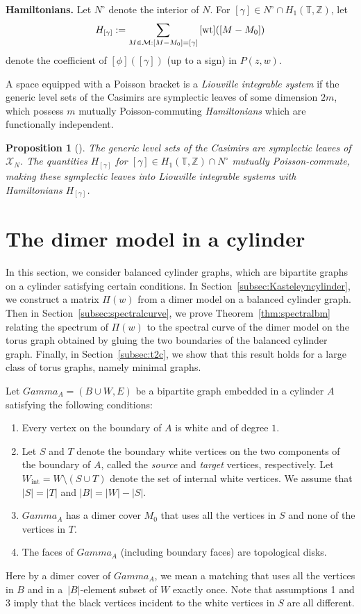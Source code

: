 \documentclass[10pt,a4paper]{amsart}
\numberwithin{equation}{section}
\newtheorem{Proposition}[Theorem]{Proposition}
 { \theoremstyle{definition}
\newtheorem{Definition}[Theorem]{Definition}
\newtheorem{Note}[Theorem]{Note}
\newtheorem{Example}[Theorem]{Example}
\newtheorem{Remark}[Theorem]{Remark} }
\newcommand{\Z}{{\mathbb Z}}
\newcommand{\T}{{\mathbb T}}
\newcommand{\A}{{\mathbb A}}
\newcommand{\la}{\label}
\def\A{A}
\def\Gamma{Gamma}
\begin{document}
	
	{\bf Hamiltonians.}
	Let $N^\circ$ denote the interior of $N$. For $[\gamma] \in N^\circ \cap H_1(\T,\Z)$, let
	\[
	H_{[\gamma]}:=\sum_{M \in \mathcal M: [M-M_0]=[\gamma]} {[\rm wt]}([M-M_0])
	\]
	denote the coefficient of $[\phi]([\gamma])$ (up to a sign) in $P(z,w)$.
	
	A space equipped with a Poisson bracket is a \emph{Liouville integrable system} if the generic level sets of the Casimirs are symplectic leaves of some dimension $2m$, which possess $m$ mutually Poisson-commuting \emph{Hamiltonians} which are functionally independent.
	
	\begin{Proposition}[]
		The generic level sets of the Casimirs are symplectic leaves of $\mathcal X_N$. The quantities $H_{[\gamma]}$ for $[\gamma] \in H_1(\T,\Z) \cap N^\circ$ mutually Poisson-commute, making these symplectic leaves into Liouville integrable systems with Hamiltonians $H_{[\gamma]}$.
	\end{Proposition}
	
	
	
	\section{The dimer model in a cylinder}
	\la{sec:cyl}
	
	In this section, we consider balanced cylinder graphs, which are bipartite graphs on a cylinder satisfying certain conditions. In Section~\ref{subsec:Kasteleyncylinder}, we construct a matrix $\Pi(w)$ from a dimer model on a balanced cylinder graph. Then in Section~\ref{subsec:spectralcurve}, we prove Theorem~\ref{thm:spectralbm} relating the spectrum of $\Pi(w)$ to the spectral curve of the dimer model on the torus graph obtained by gluing the two boundaries of the balanced cylinder graph. Finally, in Section~\ref{subsec:t2c}, we show that this result holds for a large class of torus graphs, namely minimal graphs.
	
	Let $\Gamma_{\A}=(B \cup W,E)$ be a bipartite graph embedded in a cylinder $\A$ satisfying the following conditions:
	\begin{enumerate}\itemsep=0pt
\item Every vertex on the boundary of $\A$ is white and of degree $1$.
		\item Let $S$ and $T$ denote the boundary white vertices on the two components of the boundary of $\A$, called the \emph{source} and \emph{target} vertices, respectively. Let $W_{\text{int}}=W \setminus(S \cup T)$ denote the set of internal white vertices. We assume that $|S|=|T|$ and $|B|=|W|-|S|$.
		\item $\Gamma_\A$ has a dimer cover $M_0$ that uses all the vertices in $S$ and none of the vertices in $T$.
		\item The faces of $\Gamma_\A$ (including boundary faces) are topological disks.
	\end{enumerate}
	Here by a dimer cover of $\Gamma_\A$, we mean a matching that uses all the vertices in $B$ and in \mbox{a~$|B|$-element} subset of $W$ exactly once. Note that assumptions 1 and 3 imply that the black vertices incident to the white vertices in $S$ are all different.
	
\end{document}
